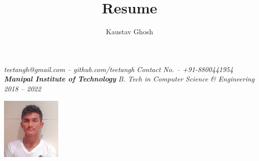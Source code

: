 \documentclass{article}
\makeatletter
\renewcommand{\maketitle}{
    \begin{flushleft}        
        {\huge\rmfamily
        \theauthor}\newline
        \vspace{0.1em}
        \textit{teetangh@gmail.com -- github.com/teetangh}\newline
        \textit{Contact No. -- +91-8800441954}\newline
        \textbf{\emph{Manipal Institute of Technology}}\newline
        \textit{B. Tech in Computer Science \& Engineering}
        \textit{2018 – 2022}\newline
    \end{flushleft}

}
\makeatother
\begin{document}
    


\begin{multicols}{2}
    \title{Resume}
        \author{Kaustav Ghosh}
    \maketitle
    \begin{flushright}
        \includegraphics[height=3cm]{kaustav.jpeg}
    \end{flushright}
\end{multicols}
\end{document}
